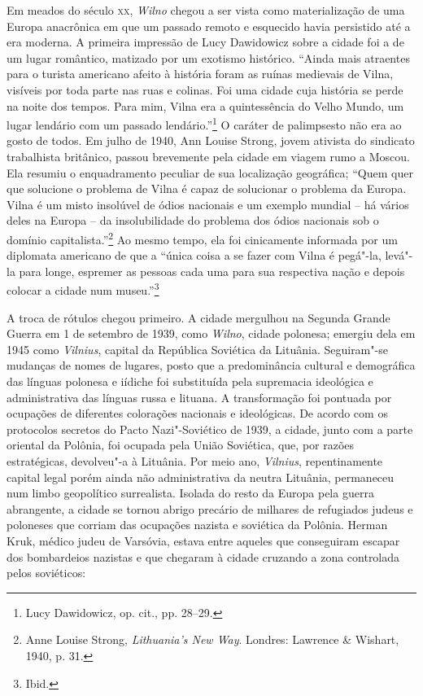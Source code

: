 Em meados do século \textsc{xx}, \textit{Wilno} chegou a ser vista como materialização de
uma Europa anacrônica em que um passado remoto e esquecido havia
persistido até a era moderna. A primeira impressão de Lucy Dawidowicz
sobre a cidade foi a de um lugar romântico, matizado por um exotismo
histórico. ``Ainda mais atraentes para o turista americano afeito à
história foram as ruínas medievais de Vilna, visíveis por toda parte nas
ruas e colinas. Foi uma cidade cuja história se perde na noite dos
tempos. Para mim, Vilna era a quintessência do Velho Mundo, um lugar
lendário com um passado lendário.''\footnote{Lucy Dawidowicz, op. cit., pp. 28--29.} O caráter de palimpsesto não era ao gosto de todos. Em julho de 1940, Ann Louise Strong, jovem ativista do sindicato
trabalhista britânico, passou brevemente pela cidade em viagem rumo a
Moscou. Ela resumiu o enquadramento peculiar de sua localização
geográfica; ``Quem quer que solucione o problema de Vilna é capaz de
solucionar o problema da Europa. Vilna é um misto insolúvel de ódios
nacionais e um exemplo mundial -- há vários deles na Europa -- da
insolubilidade do problema dos ódios nacionais sob o domínio
capitalista.''\footnote{Anne Louise Strong, \textit{Lithuania's New Way}. Londres: Lawrence \& Wishart, 1940, p. 31.} Ao mesmo tempo, ela foi cinicamente informada por um diplomata americano de que a ``única coisa
a se fazer com Vilna é pegá"-la, levá"-la para longe, espremer as pessoas
cada uma para sua respectiva nação e depois colocar a cidade num
museu.''\footnote{Ibid.}

A troca de rótulos chegou primeiro. A cidade mergulhou na Segunda Grande
Guerra em 1 de setembro de 1939, como \textit{Wilno}, cidade polonesa; emergiu
dela em 1945 como \textit{Vilnius}, capital da República Soviética da Lituânia.
Seguiram"-se mudanças de nomes de lugares, posto que a predominância
cultural e demográfica das línguas polonesa e iídiche foi substituída
pela supremacia ideológica e administrativa das línguas russa e lituana.
A transformação foi pontuada por ocupações de diferentes colorações
nacionais e ideológicas. De acordo com os protocolos secretos do Pacto
Nazi"-Soviético de 1939, a cidade, junto com a parte oriental da Polônia,
foi ocupada pela União Soviética, que, por razões estratégicas,
devolveu"-a à Lituânia. Por meio ano, \textit{Vilnius}, repentinamente capital
legal porém ainda não administrativa da neutra Lituânia, permaneceu num
limbo geopolítico surrealista. Isolada do resto da Europa pela guerra
abrangente, a cidade se tornou abrigo precário de milhares de refugiados
judeus e poloneses que corriam das ocupações nazista e soviética da
Polônia. Herman Kruk, médico judeu de Varsóvia, estava entre aqueles que
conseguiram escapar dos bombardeios nazistas e que chegaram à cidade
cruzando a zona controlada pelos soviéticos:


